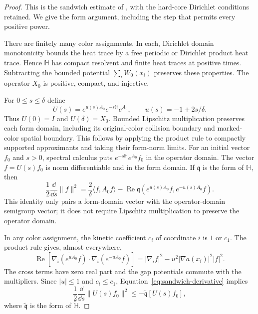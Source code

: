 \begin{proof}
This is the sandwich estimate of \citet[Lemma ``Trace bound
for a Lipschitz sandwich'']{B}, with the hard-core
Dirichlet conditions retained.  We give the form argument,
including the step that permits every positive power.

There are finitely many color assignments.  In each,
Dirichlet domain monotonicity bounds the heat trace by a
free periodic or Dirichlet product heat trace.  Hence
$\mathbb H$ has compact resolvent and finite heat traces
at positive times.  Subtracting the bounded potential
$\sum_i W_0(x_i)$ preserves these properties.
The operator $X_0$ is positive, compact, and injective.

For $0\le s\le\delta$ define
\[
 U(s)=e^{u(s)A_0}e^{-s\mathbb H}e^{A_0},
 \qquad u(s)=-1+2s/\delta.
\]
Thus $U(0)=I$ and $U(\delta)=X_0$.
Bounded Lipschitz multiplication preserves each form
domain, including its original-color collision boundary
and marked-color spatial boundary.  This follows by
applying the product rule to compactly supported
approximants and taking their form-norm limits.
For an initial vector $f_0$ and $s>0$, spectral calculus
puts $e^{-s\mathbb H}e^{A_0}f_0$ in the operator domain.
The vector $f=U(s)f_0$ is norm differentiable and in the
form domain.  If $\mathfrak q$ is the form of
$\mathbb H$, then
\begin{equation}\label{eq:sandwich-derivative}
 \frac12\frac{\dd}{\dd s}\|f\|^2
 =\frac2\delta\langle f,A_0f\rangle
 -\operatorname{Re}\mathfrak q(e^{u(s)A_0}f,e^{-u(s)A_0}f).
\end{equation}
This identity only pairs a form-domain vector with the
operator-domain semigroup vector; it does not require
Lipschitz multiplication to preserve the operator domain.

In any color assignment, the kinetic coefficient $c_i$
of coordinate $i$ is $1$ or $c_1$.  The product rule
gives, almost everywhere,
\[
 \operatorname{Re}\left[
 \overline{\nabla_i(e^{uA_0}f)}\cdot
                  \nabla_i(e^{-uA_0}f)\right]
 =|\nabla_i f|^2-u^2|\nabla a(x_i)|^2|f|^2.
\]
The cross terms have zero real part and the gap
potentials commute with the multipliers.  Since
$|u|\le1$ and $c_i\le c_1$, Equation~\eqref{eq:sandwich-derivative}
implies
\begin{equation}\label{eq:sandwich-form}
 \frac12\frac{\dd}{\dd s}\|U(s)f_0\|^2
 \le-\widetilde{\mathfrak q}[U(s)f_0],
\end{equation}
where $\widetilde{\mathfrak q}$ is the form of
$\widetilde{\mathbb H}$.


\end{proof}
